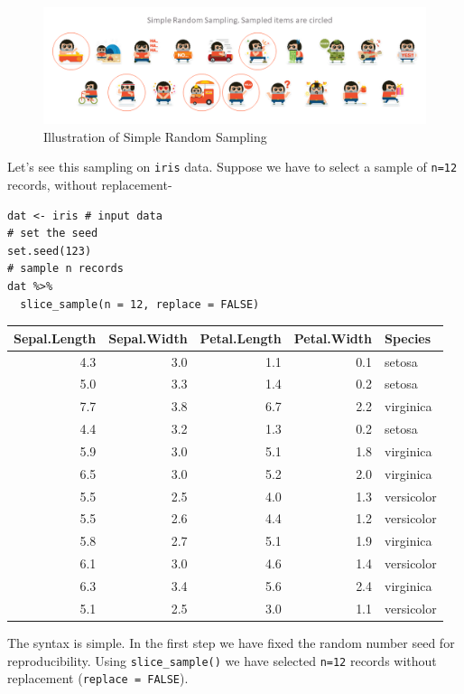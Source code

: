 \documentclass[
]{book}
\begin{document}
\begin{figure}

{\centering \includegraphics[width=0.99\linewidth]{images/simple} 

}

\caption{Illustration of Simple Random Sampling}\label{fig:simple}
\end{figure}

Let's see this sampling on \texttt{iris} data. Suppose we have to select a sample of \texttt{n=12} records, without replacement-

\begin{verbatim}
dat <- iris # input data
# set the seed
set.seed(123)
# sample n records
dat %>% 
  slice_sample(n = 12, replace = FALSE)
\end{verbatim}

\begin{tabular}{r|r|r|r|l}
\hline
Sepal.Length & Sepal.Width & Petal.Length & Petal.Width & Species\\
\hline
4.3 & 3.0 & 1.1 & 0.1 & setosa\\
\hline
5.0 & 3.3 & 1.4 & 0.2 & setosa\\
\hline
7.7 & 3.8 & 6.7 & 2.2 & virginica\\
\hline
4.4 & 3.2 & 1.3 & 0.2 & setosa\\
\hline
5.9 & 3.0 & 5.1 & 1.8 & virginica\\
\hline
6.5 & 3.0 & 5.2 & 2.0 & virginica\\
\hline
5.5 & 2.5 & 4.0 & 1.3 & versicolor\\
\hline
5.5 & 2.6 & 4.4 & 1.2 & versicolor\\
\hline
5.8 & 2.7 & 5.1 & 1.9 & virginica\\
\hline
6.1 & 3.0 & 4.6 & 1.4 & versicolor\\
\hline
6.3 & 3.4 & 5.6 & 2.4 & virginica\\
\hline
5.1 & 2.5 & 3.0 & 1.1 & versicolor\\
\hline
\end{tabular}

The syntax is simple. In the first step we have fixed the random number seed for reproducibility. Using \texttt{slice\_sample()} we have selected \texttt{n=12} records without replacement (\texttt{replace\ =\ FALSE}).
\end{document}
